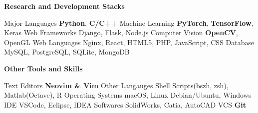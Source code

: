 
\vspace{-1em}
\begin{multicols}{2}
\textbf{Research and Development Stacks}
\vspace{-1em}
\begin{cvskills}
\cvskill
{Major Languages}
{\textbf{Python}, \textbf{C/C++}}
\cvskill
{Machine Learning}
{\textbf{PyTorch}, \textbf{TensorFlow}, Keras}
\cvskill
{Web Frameworks}
{Django, Flask, Node.js}
\cvskill
{Computer Vision}
{\textbf{OpenCV}, OpenGL}
\cvskill
{Web Languages} %
{Nginx, React, HTML5, PHP, JavaScript, CSS} %
\cvskill
{Database}
{MySQL, PostgreSQL, SQLite, MongoDB}
\end{cvskills}

\textbf{Other Tools and Skills}
\vspace{-1em}
\begin{cvskills}
  \cvskill
    {Text Editors}
    {\textbf{Neovim \& Vim}}
  \cvskill
    {Other Langauges} %
    {Shell Scripts(bszh, zsh), Matlab(Octave), R} %
  \cvskill
    {Operating Systems} %
    {macOS, Linux Debian/Ubuntu, Windows}
  \cvskill
    {IDE} %
    {VSCode, Eclipse, IDEA} %
  \cvskill
    {Softwares} %
    {SolidWorks, Catia, AutoCAD} %
  \cvskill
    {VCS}
    {\textbf{Git}} %
\end{cvskills}

\end{multicols}
\vspace{-0.5em}
